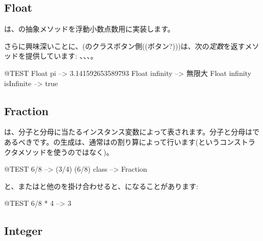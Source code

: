 \documentclass[a4paper,10pt,twoside]{book}
\begin{document}

\subsection{Float}

は、の抽象メソッドを浮動小数点数用に実装します。

さらに興味深いことに、(\ie{}のクラスボタン側((ボタン?)))は、次の\emph{定数}を返すメソッドを提供しています: 、、、。

\begin{code}{@TEST}
Float pi                      --> 3.141592653589793
Float infinity               --> 無限大
Float infinity isInfinite --> true
\end{code}

\subsection{Fraction}

は、分子と分母に当たるインスタンス変数によって表されます。分子と分母はであるべきです。の生成は、通常はの割り算によって行います(というコンストラクタメソッドを使うのではなく)。

\begin{code}{@TEST}
6/8             --> (3/4)
(6/8) class --> Fraction
\end{code}

と、またはと他のを掛け合わせると、になることがあります:

\begin{code}{@TEST}
6/8 * 4 --> 3
\end{code}


\subsection{Integer}
\end{document}
